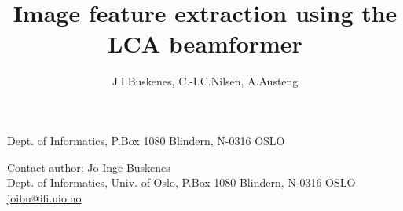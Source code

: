\documentclass[
   UAM                                          %
 , 12pt                                         %
 , xelatex                                      %
 , bibtex                                       %
 , layout
]{common/mytemplate}
\begin{document}
\pagestyle{plain}



\title{Image feature extraction using the LCA beamformer}%
%
\author{J.I.Buskenes\firstAddress, C.-I.C.Nilsen\firstAddress, A.Austeng\firstAddress}%
%
\begin{contact}
  \firstAddress Dept. of Informatics, P.Box 1080 Blindern, N-0316 OSLO
\end{contact}%
%
\begin{contact}
Contact author: Jo Inge Buskenes\\
Dept. of Informatics, Univ. of Oslo, P.Box 1080 Blindern, N-0316 OSLO\\
\href{mailto:joibu@ifi.uio.no}{joibu@ifi.uio.no}
\end{contact}%
%
\end{document}
